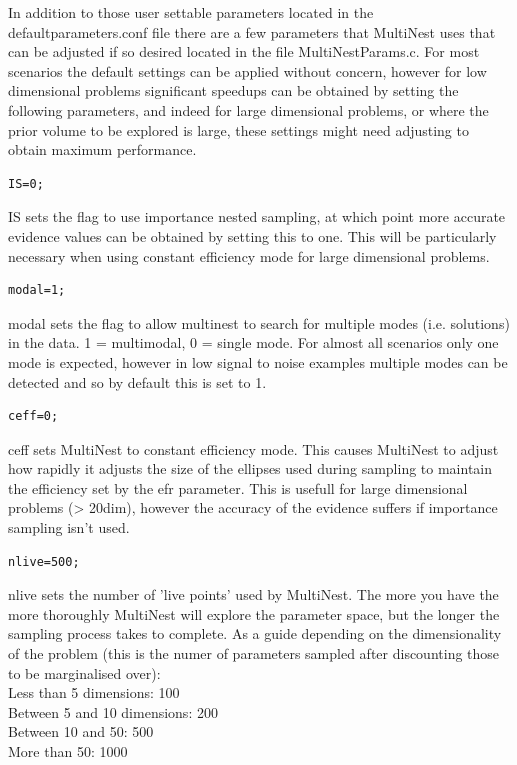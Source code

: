 \documentclass[%
 preprint,
 amsmath,amssymb,amsfonts,
 aps,
]{revtex4-1}
\begin{document}
In addition to those user settable parameters located in the defaultparameters.conf file there are a few parameters that MultiNest uses that can be adjusted if so desired located in the file MultiNestParams.c.  For most scenarios the default settings can be applied without concern, however for low dimensional problems significant speedups can be obtained by setting the following parameters, and indeed for large dimensional problems, or where the prior volume to be explored is large, these settings might need adjusting to obtain maximum performance.

\begin{lstlisting}
IS=0;
\end{lstlisting}  
  
IS sets the flag to use importance nested sampling, at which point more accurate evidence values can be obtained by setting this to one.  This will be particularly necessary when using constant efficiency mode for large dimensional problems.

\begin{lstlisting}
modal=1;
\end{lstlisting}     
modal sets the flag to allow multinest to search for multiple modes (i.e. solutions) in the data. 1 = multimodal, 0 = single mode.  For almost all scenarios only one mode is expected, however in low signal to noise examples multiple modes can be detected and so by default this is set to 1.
   
\begin{lstlisting}
ceff=0;
\end{lstlisting}  

ceff sets MultiNest to constant efficiency mode.  This causes MultiNest to adjust how rapidly it adjusts the size of the ellipses used during sampling to maintain the efficiency set by the efr parameter. This is usefull for large dimensional problems (> 20dim), however the accuracy of the evidence suffers if importance sampling isn't used.

\begin{lstlisting}
nlive=500;
\end{lstlisting}  

nlive sets the number of 'live points' used by MultiNest.  The more you have the more thoroughly MultiNest will explore the parameter space, but the longer the sampling process takes to complete.
As a guide depending on the dimensionality of the problem (this is the numer of parameters sampled after discounting those to be marginalised over): \\
%
Less than 5 dimensions: 100\\
Between 5 and 10 dimensions: 200\\
Between 10 and 50: 500\\
More than 50: 1000\\
\end{document}
